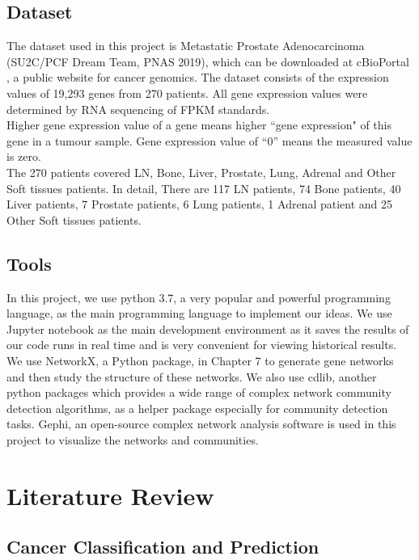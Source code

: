 \documentclass[12pt,a4paper]{report}
\begin{document}
\section{Dataset}
The dataset used in this project is Metastatic Prostate Adenocarcinoma (SU2C/PCF Dream Team, PNAS 2019), which can be downloaded at cBioPortal \cite{cBioPortal}, a public website for cancer genomics. The dataset consists of the expression values of 19,293 genes from 270 patients. All gene expression values were determined by RNA sequencing of FPKM \cite{Soo11} standards.\\

Higher gene expression value of a gene means higher ``gene expression" of this gene in a tumour sample. Gene expression value of “0” means the measured value is zero. \\

The 270 patients covered LN, Bone, Liver, Prostate, Lung, Adrenal and Other Soft tissues patients. In detail, There are 117 LN patients, 74 Bone patients, 40 Liver patients, 7 Prostate patients, 6 Lung patients, 1 Adrenal patient and 25 Other Soft tissues patients.
\\


\section{Tools }
In this project, we use python 3.7, a very popular and powerful programming language, as the main programming language to implement our ideas. We use Jupyter notebook as the main development environment as it saves the results of our code runs in real time and is very convenient for viewing historical results. We use NetworkX, a Python package, in Chapter 7 to generate gene networks and then study the structure of these networks. We also use cdlib, another python packages which provides a wide range of complex network community detection algorithms, as a helper package especially for community detection tasks. Gephi, an open-source complex network analysis software is used in this project to visualize the networks and communities. 

\chapter{Literature Review}
\section{Cancer Classification and Prediction }
\end{document}
